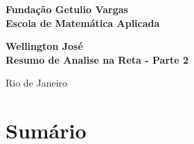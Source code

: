 \documentclass[12pt]{article}
\begin{document}
\begin{titlepage}
\begin{center}
\textbf{\LARGE Fundação Getulio Vargas}\\ 
\textbf{\LARGE Escola de Matemática Aplicada}

\par
\vspace{170pt}
\textbf{\Large Wellington José}\\
\vspace{32pt}
\textbf{\Large Resumo de Analise na Reta - Parte 2}\\
\end{center}

\par
\vfill
\begin{center}
{{\normalsize Rio de Janeiro}\\
{\normalsize \the\year}}
\end{center}
\end{titlepage}

\thispagestyle{empty}

\section*{Sumário}

\textbf{}
\vspace{4mm}

\textbf{}
\vspace{4mm} \\
\textbf{}
\vspace{4mm}

\textbf{}
\vspace{4mm}

\textbf{}
\vspace{4mm}

\textbf{}
\vspace{4mm}

\textbf{}
\vspace{4mm} \\
\textbf{}
\vspace{4mm}

\textbf{}
\vspace{4mm}

\textbf{}
\vspace{4mm}

\textbf{}
\vspace{4mm}
\end{document}
